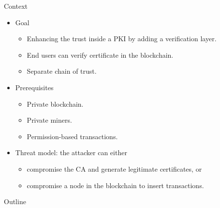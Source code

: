 \documentclass[11pt, aspectratio=169]{beamer}
\begin{document}
\begin{frame}{Context}

\begin{itemize}
\item Goal
\begin{itemize}
\item Enhancing the trust inside a PKI by adding a verification layer.
\item End users can verify certificate in the blockchain.
\item Separate chain of trust.
\end{itemize}
\item Prerequisites
\begin{itemize}
\item Private blockchain.
\item Private miners.
\item Permission-based transactions.
\end{itemize}
\item Threat model: the attacker can either
\begin{itemize}
\item compromise the CA and generate legitimate certificates, or
\item compromise a node in the blockchain to insert transactions.
\end{itemize}
\end{itemize}

\end{frame}


\begin{frame}{Outline}
\tableofcontents
\end{frame}








%






\end{document}
